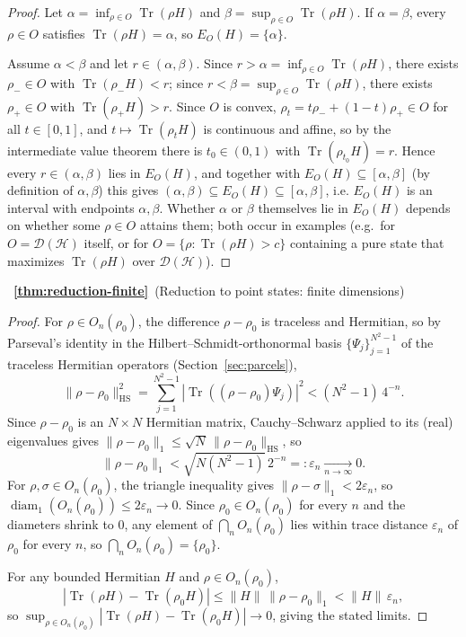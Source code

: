 \documentclass[11pt, onecolumn]{article}
\begin{document}
\begin{proof}
Let $\alpha=\inf_{\rho\in O}\operatorname{Tr}(\rho H)$ and $\beta=\sup_{\rho\in O}\operatorname{Tr}(\rho H)$. If $\alpha=\beta$, every $\rho\in O$ satisfies $\operatorname{Tr}(\rho H)=\alpha$, so $E_O(H)=\{\alpha\}$.

Assume $\alpha<\beta$ and let $r\in(\alpha,\beta)$. Since $r>\alpha=\inf_{\rho\in O}\operatorname{Tr}(\rho H)$, there exists $\rho_-\in O$ with $\operatorname{Tr}(\rho_-H)<r$; since $r<\beta=\sup_{\rho\in O}\operatorname{Tr}(\rho H)$, there exists $\rho_+\in O$ with $\operatorname{Tr}(\rho_+H)>r$. Since $O$ is convex, $\rho_t=t\rho_-+(1-t)\rho_+\in O$ for all $t\in[0,1]$, and $t\mapsto\operatorname{Tr}(\rho_tH)$ is continuous and affine, so by the intermediate value theorem there is $t_0\in(0,1)$ with $\operatorname{Tr}(\rho_{t_0}H)=r$. Hence every $r\in(\alpha,\beta)$ lies in $E_O(H)$, and together with $E_O(H)\subseteq[\alpha,\beta]$ (by definition of $\alpha,\beta$) this gives $(\alpha,\beta)\subseteq E_O(H)\subseteq[\alpha,\beta]$, i.e. $E_O(H)$ is an interval with endpoints $\alpha,\beta$. Whether $\alpha$ or $\beta$ themselves lie in $E_O(H)$ depends on whether some $\rho\in O$ attains them; both occur in examples (e.g.\ for $O=\mathcal D(\mathcal H)$ itself, or for $O=\{\rho:\operatorname{Tr}(\rho H)>c\}$ containing a pure state that maximizes $\operatorname{Tr}(\rho H)$ over $\mathcal D(\mathcal H)$).
\end{proof}

~{\bf \ref{thm:reduction-finite}}~(Reduction to point states: finite dimensions)

\begin{proof}
For $\rho\in O_n(\rho_0)$, the difference $\rho-\rho_0$ is traceless and Hermitian, so by Parseval's identity in the Hilbert--Schmidt-orthonormal basis $\{\Psi_j\}_{j=1}^{N^2-1}$ of the traceless Hermitian operators (Section~\ref{sec:parcels}),
\[
\|\rho-\rho_0\|_{\mathrm{HS}}^2
=
\sum_{j=1}^{N^2-1}|\operatorname{Tr}((\rho-\rho_0)\Psi_j)|^2
<(N^2-1)\,4^{-n}.
\]
Since $\rho-\rho_0$ is an $N\times N$ Hermitian matrix, Cauchy--Schwarz applied to its (real) eigenvalues gives $\|\rho-\rho_0\|_1\le\sqrt N\,\|\rho-\rho_0\|_{\mathrm{HS}}$, so
\[
\|\rho-\rho_0\|_1 < \sqrt{N(N^2-1)}\,2^{-n} =: \varepsilon_n \xrightarrow[n\to\infty]{}0.
\]
For $\rho,\sigma\in O_n(\rho_0)$, the triangle inequality gives $\|\rho-\sigma\|_1<2\varepsilon_n$, so $\operatorname{diam}_1(O_n(\rho_0))\le2\varepsilon_n\to0$. Since $\rho_0\in O_n(\rho_0)$ for every $n$ and the diameters shrink to $0$, any element of $\bigcap_n O_n(\rho_0)$ lies within trace distance $\varepsilon_n$ of $\rho_0$ for every $n$, so $\bigcap_n O_n(\rho_0)=\{\rho_0\}$.

For any bounded Hermitian $H$ and $\rho\in O_n(\rho_0)$,
\[
|\operatorname{Tr}(\rho H)-\operatorname{Tr}(\rho_0H)| \le \|H\|\,\|\rho-\rho_0\|_1 < \|H\|\,\varepsilon_n,
\]
so $\sup_{\rho\in O_n(\rho_0)}|\operatorname{Tr}(\rho H)-\operatorname{Tr}(\rho_0H)|\to0$, giving the stated limits.
\end{proof}
\end{document}
